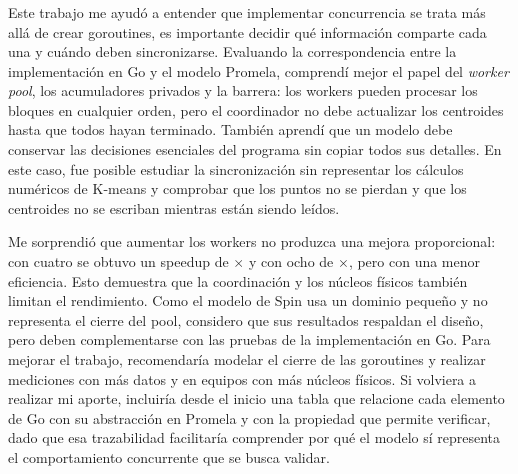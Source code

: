 \subsubsection*{\nombreDayana}

Este trabajo me ayudó a entender que implementar concurrencia se trata más allá de crear
goroutines, es importante decidir qué información comparte cada una y cuándo deben sincronizarse. Evaluando la 
correspondencia entre la implementación en Go y el modelo Promela, comprendí mejor
el papel del \emph{worker pool}, los acumuladores privados y la barrera: los workers pueden procesar
los bloques en cualquier orden, pero el coordinador no debe actualizar los centroides hasta que
todos hayan terminado. También aprendí que un modelo debe conservar las decisiones esenciales del
programa sin copiar todos sus detalles. En este caso, fue posible estudiar la sincronización sin
representar los cálculos numéricos de K-means y comprobar que los puntos no se pierdan y que los
centroides no se escriban mientras están siendo leídos.

Me sorprendió que aumentar los workers no produzca una mejora proporcional: con cuatro se obtuvo
un speedup de $\times$ y con ocho de $\times$, pero con una menor
eficiencia. Esto demuestra que la coordinación y los núcleos físicos también limitan el rendimiento.
Como el modelo de Spin usa un dominio pequeño y no representa el cierre del pool, considero que sus
resultados respaldan el diseño, pero deben complementarse con las pruebas de la implementación en
Go. Para mejorar el trabajo, recomendaría modelar el cierre de las goroutines y realizar mediciones
con más datos y en equipos con más núcleos físicos. Si volviera a realizar mi aporte, incluiría
desde el inicio una tabla que relacione cada elemento de Go con su abstracción en Promela y con la
propiedad que permite verificar, dado que esa trazabilidad facilitaría comprender por qué el modelo sí
representa el comportamiento concurrente que se busca validar.
